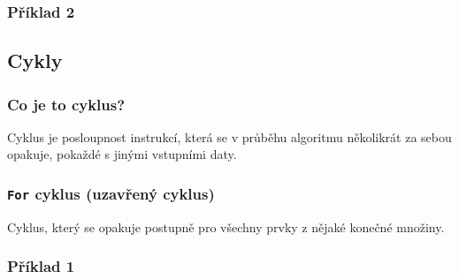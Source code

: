 \documentclass[aspectratio=169,11pt,handout]{beamer}
\begin{document}
\begin{frame}
 \frametitle{Příklad 2}
 \centering
 \begin{minipage}{.9\textwidth}
  \begin{algorithm}[H]
   \DontPrintSemicolon

   \BlankLine
  \end{algorithm}
 \end{minipage}
\end{frame}

\subsection[Cykly]{Cykly}

\begin{frame}
 \frametitle{Co je to cyklus?}
 \begin{tcolorbox}[title=Cyklus,center,width=.9\textwidth]
  Cyklus je posloupnost instrukcí, která se v průběhu algoritmu
  \alert{několikrát za sebou opakuje}, pokaždé s jinými vstupními daty.
 \end{tcolorbox}
\end{frame}

\begin{frame}
 \frametitle{\texttt{For} cyklus (uzavřený cyklus)}
 \begin{tcolorbox}[title=\texttt{For} cyklus,center,width=.9\textwidth]
  Cyklus, který se opakuje postupně pro \alert{všechny prvky z nějaké konečné
  množiny}.
 \end{tcolorbox}
\end{frame}

\begin{frame}
 \frametitle{Příklad 1}
 \centering
\end{frame}
\end{document}
